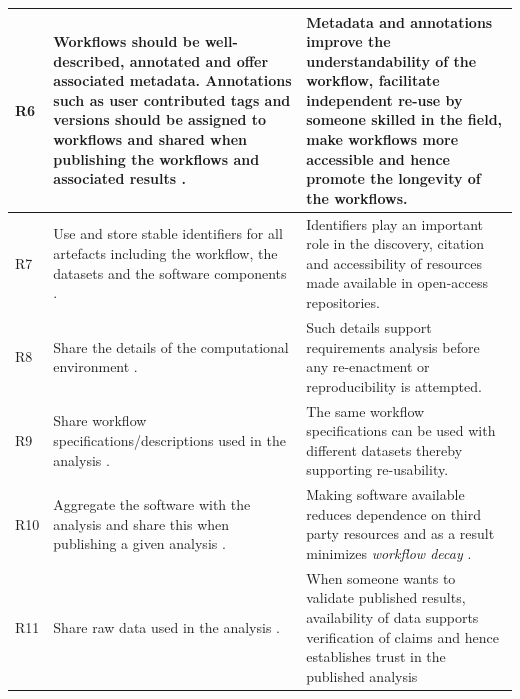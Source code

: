 \documentclass[a4paper,num-refs]{oup-contemporary}
\begin{document}
\begin{table}[!htbp]
\begin{tabularx}{\linewidth}{p{1.4cm} L L}
R6 \newline{} & Workflows should be well-described, annotated and offer associated metadata. Annotations such as user contributed tags and versions should be assigned to workflows and shared when publishing the workflows and associated results \citep{belhajjame_2015, belhajjame_2012, garijo_2017, Littauer2012, stodden_2016} . &   Metadata and annotations  improve the understandability of the workflow, facilitate independent re-use by someone skilled in the field, make workflows more accessible and hence promote the longevity of the workflows.   \\ \midrule
R7 \newline{} & Use and store stable identifiers for all artefacts including the workflow, the datasets and the software components \citep{Littauer2012, stodden_2016}. &   Identifiers play an important role in the discovery, citation and accessibility of resources made available in open-access repositories.  \\  \midrule
R8 \newline{} &  Share the details of the computational environment \citep{belhajjame_2015, kanwal_2017, stodden_2016} . &  Such details support requirements analysis before any re-enactment or reproducibility  is attempted.  \\  \midrule
R9 \newline{} & Share workflow specifications/descriptions used in the analysis \citep{belhajjame_2015, garijo_2013, garijo_2017, stodden_2016, Stodden2014}. &   The same workflow specifications can be used with different datasets thereby supporting re-usability.  \\ \midrule
R10 \newline{} & Aggregate the software with the analysis and share this when publishing a given analysis \citep{belhajjame_2015, kanwal_2017, stodden_2016, Stodden2014, garijo_2017}.   &   Making  software available reduces dependence on third party resources and as a result minimizes \textit{workflow decay} \citep{Zhao2012}.  \\  \midrule
R11 \newline{} & Share raw data used in the analysis \citep{belhajjame_2015, garijo_2013, garijo_2017, stodden_2016, Stodden2014}. & When someone wants to validate published results, availability of data supports verification of claims and hence establishes trust in the published analysis  \\  \midrule

\end{tabularx}
\end{table}
\end{document}
